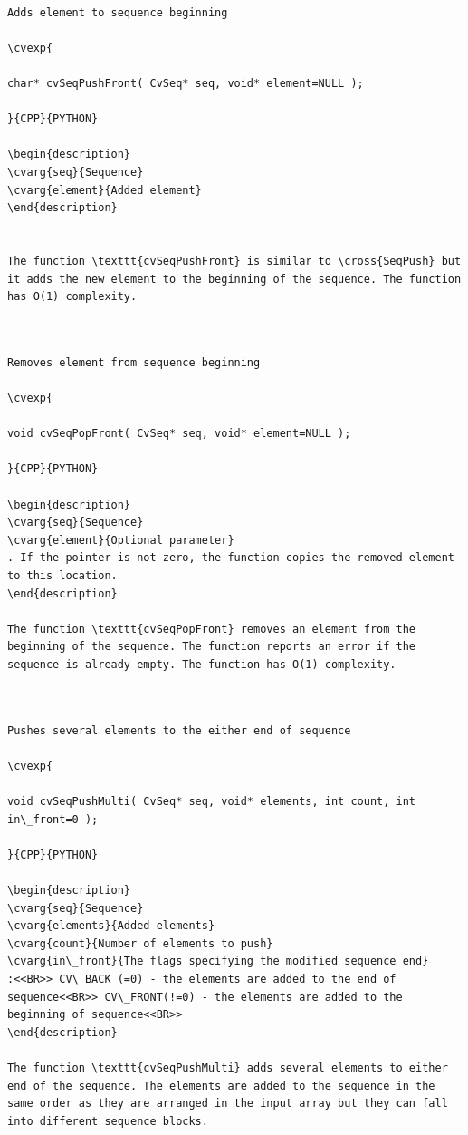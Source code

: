 \label{SeqPushFront}
\begin{verbatim}

Adds element to sequence beginning

\cvexp{

char* cvSeqPushFront( CvSeq* seq, void* element=NULL );

}{CPP}{PYTHON}

\begin{description}
\cvarg{seq}{Sequence}
\cvarg{element}{Added element}
\end{description}


The function \texttt{cvSeqPushFront} is similar to \cross{SeqPush} but it adds the new element to the beginning of the sequence. The function has O(1) complexity.


\end{verbatim}
\label{SeqPopFront}
\begin{verbatim}

Removes element from sequence beginning

\cvexp{

void cvSeqPopFront( CvSeq* seq, void* element=NULL );

}{CPP}{PYTHON}

\begin{description}
\cvarg{seq}{Sequence}
\cvarg{element}{Optional parameter}
. If the pointer is not zero, the function copies the removed element to this location.
\end{description}

The function \texttt{cvSeqPopFront} removes an element from the beginning of the sequence. The function reports an error if the sequence is already empty. The function has O(1) complexity.


\end{verbatim}
\label{SeqPushMulti}
\begin{verbatim}

Pushes several elements to the either end of sequence

\cvexp{

void cvSeqPushMulti( CvSeq* seq, void* elements, int count, int in\_front=0 );

}{CPP}{PYTHON}

\begin{description}
\cvarg{seq}{Sequence}
\cvarg{elements}{Added elements}
\cvarg{count}{Number of elements to push}
\cvarg{in\_front}{The flags specifying the modified sequence end}
:<<BR>> CV\_BACK (=0) - the elements are added to the end of sequence<<BR>> CV\_FRONT(!=0) - the elements are added to the beginning of sequence<<BR>>
\end{description}

The function \texttt{cvSeqPushMulti} adds several elements to either end of the sequence. The elements are added to the sequence in the same order as they are arranged in the input array but they can fall into different sequence blocks.


\end{verbatim}
